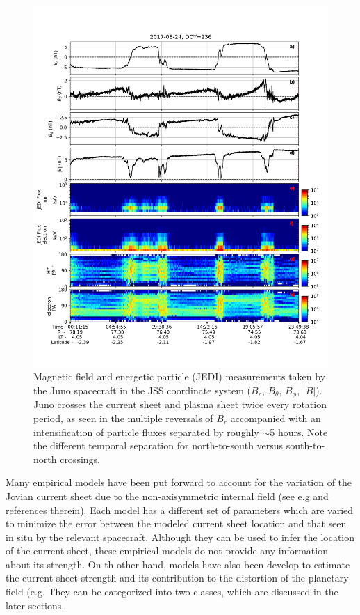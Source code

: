 \begin{figure}
    \centering
    \includegraphics[height=0.8\textheight]{images5/Juno-currentsheet-magjedi.png}
    \caption{Magnetic field and energetic particle (JEDI) measurements taken by the Juno spacecraft in the JSS coordinate system ($B_r$, $B_\theta$, $B_\phi$, $|B|$). Juno crosses the current sheet and plasma sheet twice every rotation period, as seen in the multiple reversals of $B_r$ accompanied with an intensification of particle fluxes separated by roughly $\sim$5 hours. Note the different temporal separation for north-to-south versus south-to-north crossings.}
    \label{fig:juno-current-sheet}
\end{figure}

Many empirical models have been put forward to account for the variation of the Jovian current sheet due to the non-axisymmetric internal field (see e.g  and references therein). Each model has a different set of parameters which are varied to minimize the error between the modeled current sheet location and that seen in situ by the relevant spacecraft. Although they can be used to infer the location of the current sheet, these empirical models do not provide any information about its strength. On th other hand, models have also been develop to estimate the current sheet strength and its contribution to the distortion of the planetary field (e.g. 
They can be categorized into two classes, which are discussed in the later sections. 


